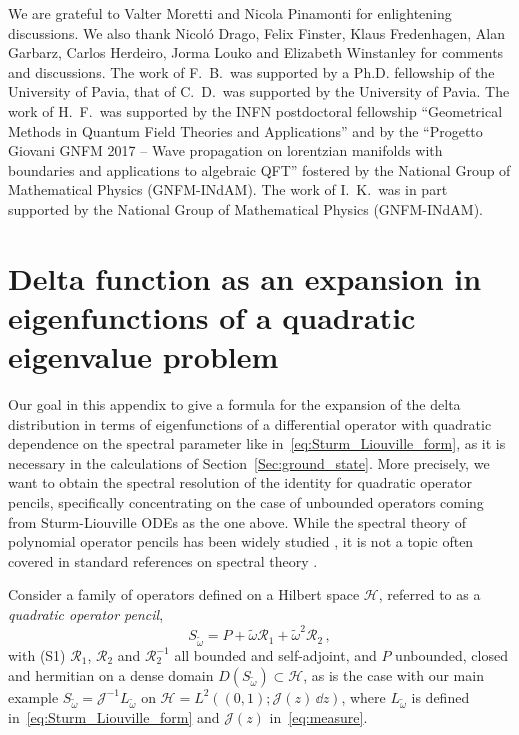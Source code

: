 \documentclass[aps, prd, amsmath, floats, floatfix, twocolumn, nofootinbib, superscriptaddress, showpacs]{revtex4-1}
\def\H{\mathcal{H}}
\def\cJ{\mathcal{J}}
\def\cR{\mathcal{R}}
\def\tomega{{\tilde{\omega}}}
\begin{document}

\begin{acknowledgments}
	We are grateful to Valter Moretti and Nicola Pinamonti for enlightening discussions. We also thank Nicol\'o Drago, Felix Finster, Klaus Fredenhagen, Alan Garbarz, Carlos Herdeiro, Jorma Louko and Elizabeth Winstanley for comments and discussions. The work of F.~B.\ was supported by a Ph.D. fellowship of the University of Pavia, that of C.~D.\ was supported by the University of Pavia. The work of H.~F.\ was supported by the INFN postdoctoral fellowship ``Geometrical Methods in Quantum Field Theories and Applications'' and by the ``Progetto Giovani GNFM 2017 -- Wave propagation on lorentzian manifolds with boundaries and applications to algebraic QFT'' fostered by the National Group of Mathematical Physics (GNFM-INdAM). The work of I.~K.\ was in part supported by the National Group of Mathematical Physics (GNFM-INdAM).
\end{acknowledgments}





\appendix

\section{Delta function as an expansion in eigenfunctions of a quadratic eigenvalue problem}
\label{apx:deltaexpansion}

Our goal in this appendix to give a formula for the expansion of the
delta distribution in terms of eigenfunctions of a differential operator
with quadratic dependence on the spectral parameter like
in~\eqref{eq:Sturm_Liouville_form}, as it is necessary in the
calculations of Section~\ref{Sec:ground_state}. More precisely, we want
to obtain the spectral resolution of the identity for quadratic operator
pencils, specifically concentrating on the case of unbounded operators
coming from Sturm-Liouville ODEs as the one above. While the spectral
theory of polynomial operator pencils has been widely studied
\cite{keldysh,markus}, it is not a topic often covered in
standard references on spectral theory \cite{reedsimon,kato}.

Consider a family of operators defined on a Hilbert space $\H$, referred
to as a \emph{quadratic operator pencil},
\begin{equation}
S_\tomega = P + \tomega \cR_1 + \tomega^2 \cR_2 \, ,
\end{equation}
with (S1) $\cR_1$, $\cR_2$ and $\cR_2^{-1}$ all bounded and self-adjoint,
and $P$ unbounded, closed and hermitian on a dense domain $D(S_\tomega) \subset
\H$, as is the case with our main example $S_\tomega = \cJ^{-1}
L_\tomega$ on $\H = L^2((0,1); \cJ(z)\,\dd{z})$, where $L_\tomega$ is
defined in~\eqref{eq:Sturm_Liouville_form} and $\cJ(z)$
in~\eqref{eq:measure}.
\end{document}
